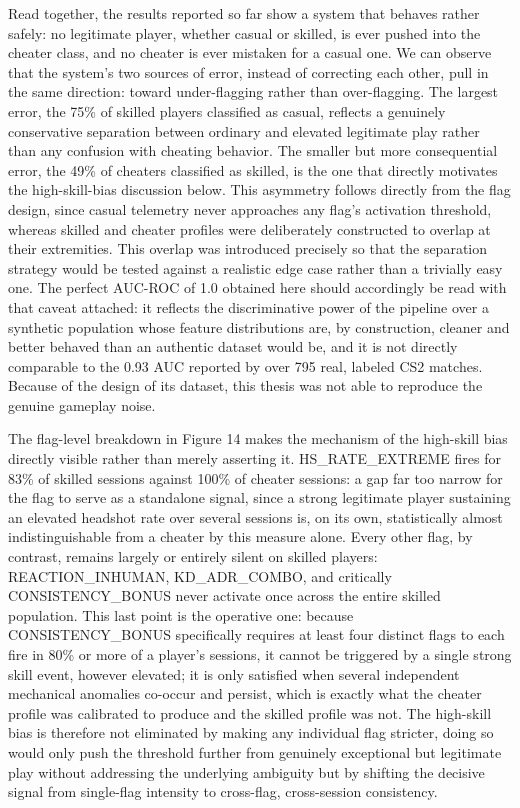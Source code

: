 Read together, the results reported so far show a system that behaves rather safely: no legitimate player, whether casual or skilled, is ever pushed into the cheater class, and no cheater is ever mistaken for a casual one. We can observe that the system's two sources of error, instead of correcting each other, pull in the same direction: toward under-flagging rather than over-flagging. The largest error, the 75\% of skilled players classified as casual, reflects a genuinely conservative separation between ordinary and elevated legitimate play rather than any confusion with cheating behavior. The smaller but more consequential error, the 49\% of cheaters classified as skilled, is the one that directly motivates the high-skill-bias discussion below. This asymmetry follows directly from the flag design, since casual telemetry never approaches any flag's activation threshold, whereas skilled and cheater profiles were deliberately constructed to overlap at their extremities. This overlap was introduced precisely so that the separation strategy would be tested against a realistic edge case rather than a trivially easy one. The perfect AUC-ROC of 1.0 obtained here should accordingly be read with that caveat attached: it reflects the discriminative power of the pipeline over a synthetic population whose feature distributions are, by construction, cleaner and better behaved than an authentic dataset would be, and it is not directly comparable to the 0.93 AUC reported by \citeauthor{Loo2025} \cite{Loo2025} over 795 real, labeled CS2 matches. Because of the design of its dataset, this thesis was not able to reproduce the genuine gameplay noise.

The flag-level breakdown in Figure 14 makes the mechanism of the high-skill bias directly visible rather than merely asserting it. HS\_RATE\_EXTREME fires for 83\% of skilled sessions against 100\% of cheater sessions: a gap far too narrow for the flag to serve as a standalone signal, since a strong legitimate player sustaining an elevated headshot rate over several sessions is, on its own, statistically almost indistinguishable from a cheater by this measure alone. Every other flag, by contrast, remains largely or entirely silent on skilled players: REACTION\_INHUMAN, KD\_ADR\_COMBO, and critically CONSISTENCY\_BONUS never activate once across the entire skilled population. This last point is the operative one: because CONSISTENCY\_BONUS specifically requires at least four distinct flags to each fire in 80\% or more of a player's sessions, it cannot be triggered by a single strong skill event, however elevated; it is only satisfied when several independent mechanical anomalies co-occur and persist, which is exactly what the cheater profile was calibrated to produce and the skilled profile was not. The high-skill bias is therefore not eliminated by making any individual flag stricter, doing so would only push the threshold further from genuinely exceptional but legitimate play without addressing the underlying ambiguity but by shifting the decisive signal from single-flag intensity to cross-flag, cross-session consistency.

